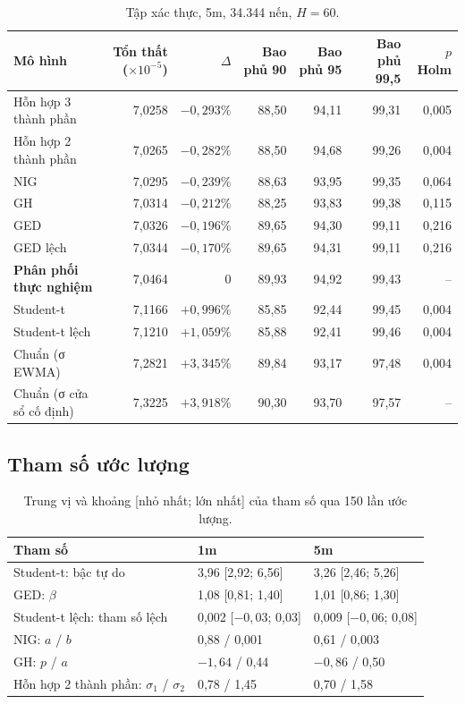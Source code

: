 \documentclass[11pt,a4paper]{article}
\begin{document}
\begin{table}[h]
\centering
\small
\caption{Tập xác thực, 5m, 34.344 nến, $H=60$.}
\label{tab:p6-5m}
\begin{tabular}{lrrrrrr}
\toprule
Mô hình & Tổn thất ($\times10^{-5}$) & $\Delta$ & Bao phủ 90 & Bao phủ 95 & Bao phủ 99,5 & $p$ Holm \\
\midrule
Hỗn hợp 3 thành phần & 7,0258 & $-0{,}293\%$ & 88,50 & 94,11 & 99,31 & 0,005 \\
Hỗn hợp 2 thành phần & 7,0265 & $-0{,}282\%$ & 88,50 & 94,68 & 99,26 & 0,004 \\
NIG & 7,0295 & $-0{,}239\%$ & 88,63 & 93,95 & 99,35 & 0,064 \\
GH & 7,0314 & $-0{,}212\%$ & 88,25 & 93,83 & 99,38 & 0,115 \\
GED & 7,0326 & $-0{,}196\%$ & 89,65 & 94,30 & 99,11 & 0,216 \\
GED lệch & 7,0344 & $-0{,}170\%$ & 89,65 & 94,31 & 99,11 & 0,216 \\
\textbf{Phân phối thực nghiệm} & 7,0464 & 0 & 89,93 & 94,92 & 99,43 & -- \\
Student-t & 7,1166 & $+0{,}996\%$ & 85,85 & 92,44 & 99,45 & 0,004 \\
Student-t lệch & 7,1210 & $+1{,}059\%$ & 85,88 & 92,41 & 99,46 & 0,004 \\
Chuẩn (σ EWMA) & 7,2821 & $+3{,}345\%$ & 89,84 & 93,17 & 97,48 & 0,004 \\
Chuẩn (σ cửa sổ cố định) & 7,3225 & $+3{,}918\%$ & 90,30 & 93,70 & 97,57 & -- \\
\bottomrule
\end{tabular}
\end{table}

\subsection{Tham số ước lượng}

\begin{table}[h]
\centering
\small
\caption{Trung vị và khoảng [nhỏ nhất; lớn nhất] của tham số qua 150 lần ước lượng.}
\begin{tabular}{lll}
\toprule
Tham số & 1m & 5m \\
\midrule
Student-t: bậc tự do & 3,96 [2,92; 6,56] & 3,26 [2,46; 5,26] \\
GED: $\beta$ & 1,08 [0,81; 1,40] & 1,01 [0,86; 1,30] \\
Student-t lệch: tham số lệch & 0,002 [$-0{,}03$; 0,03] & 0,009 [$-0{,}06$; 0,08] \\
NIG: $a$ / $b$ & 0,88 / 0,001 & 0,61 / 0,003 \\
GH: $p$ / $a$ & $-1{,}64$ / 0,44 & $-0{,}86$ / 0,50 \\
Hỗn hợp 2 thành phần: $\sigma_1$ / $\sigma_2$ & 0,78 / 1,45 & 0,70 / 1,58 \\
\bottomrule
\end{tabular}
\end{table}
\end{document}
